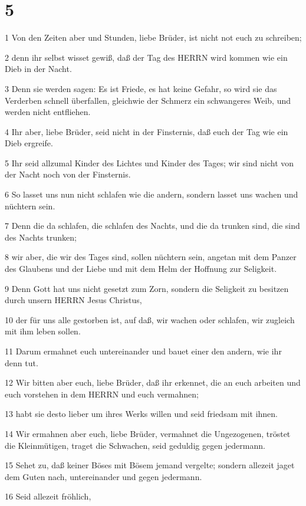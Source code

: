 \chapter{5}

\par 1 Von den Zeiten aber und Stunden, liebe Brüder, ist nicht not euch zu schreiben;
\par 2 denn ihr selbst wisset gewiß, daß der Tag des HERRN wird kommen wie ein Dieb in der Nacht.
\par 3 Denn sie werden sagen: Es ist Friede, es hat keine Gefahr, so wird sie das Verderben schnell überfallen, gleichwie der Schmerz ein schwangeres Weib, und werden nicht entfliehen.
\par 4 Ihr aber, liebe Brüder, seid nicht in der Finsternis, daß euch der Tag wie ein Dieb ergreife.
\par 5 Ihr seid allzumal Kinder des Lichtes und Kinder des Tages; wir sind nicht von der Nacht noch von der Finsternis.
\par 6 So lasset uns nun nicht schlafen wie die andern, sondern lasset uns wachen und nüchtern sein.
\par 7 Denn die da schlafen, die schlafen des Nachts, und die da trunken sind, die sind des Nachts trunken;
\par 8 wir aber, die wir des Tages sind, sollen nüchtern sein, angetan mit dem Panzer des Glaubens und der Liebe und mit dem Helm der Hoffnung zur Seligkeit.
\par 9 Denn Gott hat uns nicht gesetzt zum Zorn, sondern die Seligkeit zu besitzen durch unsern HERRN Jesus Christus,
\par 10 der für uns alle gestorben ist, auf daß, wir wachen oder schlafen, wir zugleich mit ihm leben sollen.
\par 11 Darum ermahnet euch untereinander und bauet einer den andern, wie ihr denn tut.
\par 12 Wir bitten aber euch, liebe Brüder, daß ihr erkennet, die an euch arbeiten und euch vorstehen in dem HERRN und euch vermahnen;
\par 13 habt sie desto lieber um ihres Werks willen und seid friedsam mit ihnen.
\par 14 Wir ermahnen aber euch, liebe Brüder, vermahnet die Ungezogenen, tröstet die Kleinmütigen, traget die Schwachen, seid geduldig gegen jedermann.
\par 15 Sehet zu, daß keiner Böses mit Bösem jemand vergelte; sondern allezeit jaget dem Guten nach, untereinander und gegen jedermann.
\par 16 Seid allezeit fröhlich,
